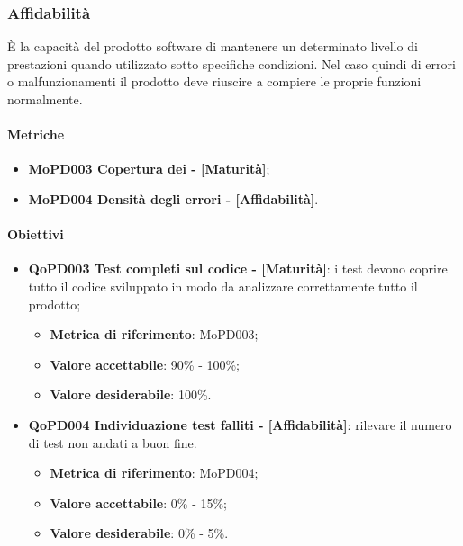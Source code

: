 \documentclass[../piano-di-qualifica.tex]{subfiles}
\begin{document}
\subsubsection{Affidabilità}%
\label{sub:affidabilita}
È la capacità del prodotto software di mantenere un determinato livello di prestazioni quando utilizzato sotto specifiche condizioni.
Nel caso quindi di errori o malfunzionamenti il prodotto deve riuscire a compiere le proprie funzioni normalmente.

\paragraph{Metriche}
\label{sub:metriche}
\begin{itemize}
    \item \textbf{MoPD003 Copertura dei  - [Maturità]};
    \item \textbf{MoPD004 Densità degli errori - [Affidabilità]}.
\end{itemize}

\paragraph{Obiettivi}
\label{sub:obiettivi}
\begin{itemize}
    \item \textbf{QoPD003 Test completi sul codice - [Maturità]}: i test devono coprire tutto il codice sviluppato in modo da analizzare correttamente tutto il prodotto;
        \begin{itemize}
            \item \textbf{Metrica di riferimento}: MoPD003;
            \item \textbf{Valore accettabile}: 90\% - 100\%;
            \item \textbf{Valore desiderabile}: 100\%.
        \end{itemize}
    \item \textbf{QoPD004 Individuazione test falliti - [Affidabilità]}: rilevare il numero di test non andati a buon fine.
        \begin{itemize}
            \item \textbf{Metrica di riferimento}: MoPD004;
            \item \textbf{Valore accettabile}: 0\% - 15\%;
            \item \textbf{Valore desiderabile}: 0\% - 5\%.
        \end{itemize}
\end{itemize}
\end{document}
